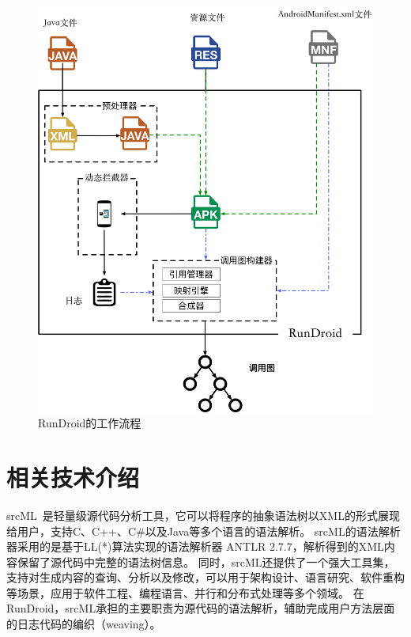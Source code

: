 \begin{figure}[!ht]
	\centering
	\includegraphics[height=0.7\textheight]{./Figures/rundroid-overview.png}
	\caption{ RunDroid的工作流程}
	\label{fig:rundroid_overview}
\end{figure}


\section{相关技术介绍}


srcML~\cite{collard2013srcml}是轻量级源代码分析工具，它可以将程序的抽象语法树以XML的形式展现给用户，支持C、C++、C\#以及Java等多个语言的语法解析。
srcML的语法解析器采用的是基于LL(*)算法实现的语法解析器 ANTLR 2.7.7，解析得到的XML内容保留了源代码中完整的语法树信息。
同时，srcML还提供了一个强大工具集，支持对生成内容的查询、分析以及修改，可以用于架构设计、语言研究、软件重构等场景，应用于软件工程、编程语言、并行和分布式处理等多个领域。
在RunDroid，srcML承担的主要职责为源代码的语法解析，辅助完成用户方法层面的日志代码的编织（weaving）。

